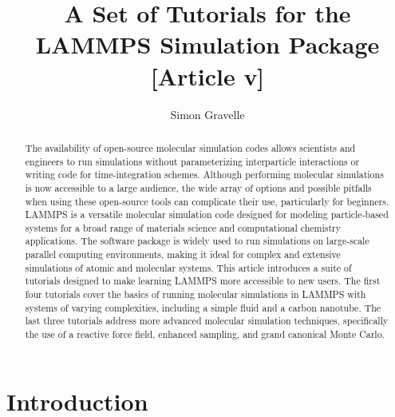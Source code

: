 \documentclass[9pt,tutorial]{livecoms}
\title{A Set of Tutorials for the LAMMPS Simulation Package [Article v\versionnumber]}
\author[1*]{Simon Gravelle}
\affil[1]{University Grenoble Alpes, CNRS, LIPhy, Grenoble, 38000, France}
\begin{document}
\begin{frontmatter}
\maketitle

\begin{abstract}
The availability of open-source molecular simulation codes allows scientists and engineers to run simulations without parameterizing interparticle interactions or writing code for time-integration schemes. Although performing molecular simulations is now accessible to a large audience, the wide array of options and possible pitfalls when using these open-source tools can complicate their use, particularly for beginners. LAMMPS is a versatile molecular simulation code designed for modeling particle-based systems for a broad range of materials science and computational chemistry applications. The software package is widely used to run simulations on large-scale parallel computing environments, making it ideal for complex and extensive simulations of atomic and molecular systems. This article introduces a suite of tutorials designed to make learning LAMMPS more accessible to new users. The first four tutorials cover the basics of running molecular simulations in LAMMPS with systems of varying complexities, including a simple fluid and a carbon nanotube. The last three tutorials address more advanced molecular simulation techniques, specifically the use of a reactive force field, enhanced sampling, and grand canonical Monte Carlo.
\end{abstract}

\end{frontmatter}

\section{Introduction}



\end{document}
